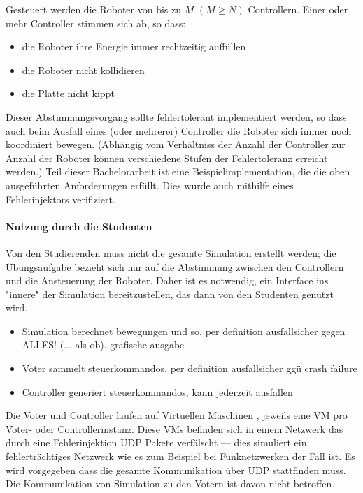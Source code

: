 \documentclass[
    12pt,
    bibliography=totoc,
    ngerman,
    enabledeprecatedfontcommands
]{scrartcl}
\begin{document}
Gesteuert werden die Roboter von bis zu $M$ $(M \geq N)$ Controllern. Einer oder mehr Controller stimmen sich ab,
so dass:
\begin{itemize}
\item die Roboter ihre Energie immer rechtzeitig auff{\"{u}}llen
\item die Roboter nicht kollidieren
\item die Platte nicht kippt
\end{itemize}

Dieser Abstimmungsvorgang sollte fehlertolerant implementiert werden, so dass auch beim Ausfall eines (oder mehrerer) Controller die Roboter sich immer noch koordiniert bewegen. (Abh{\"{a}}ngig vom Verh{\"{a}}ltniss der Anzahl der Controller zur
Anzahl der Roboter k{\"{o}}nnen verschiedene Stufen der Fehlertoleranz erreicht werden.\cite[s.149]{Werner00})
Teil dieser Bachelorarbeit ist eine
Beispielimplementation, die die oben ausgef{\"{u}}hrten Anforderungen erf{\"{u}}llt. Dies wurde auch mithilfe eines Fehlerinjektors verifiziert.

\paragraph{Nutzung durch die Studenten} Von den Studierenden muss nicht die gesamte Simulation erstellt werden; die {\"{U}}bungsaufgabe bezieht sich nur auf die Abstimmung zwischen den Controllern und die Ansteuerung der Roboter.
Daher ist es notwendig, ein Interface ins "innere" der Simulation bereitzustellen, das dann von den Studenten genutzt wird.

\begin{itemize}
\item Simulation berechnet bewegungen und so. per definition ausfallsicher gegen ALLES! (... als ob). grafische ausgabe
\item Voter sammelt steuerkommandos. per definition ausfallsicher ggü crash failure
\item Controller generiert steuerkommandos, kann jederzeit ausfallen
\end{itemize}

Die Voter und Controller laufen auf Virtuellen Maschinen , jeweils eine VM pro Voter- oder Controllerinstanz. Diese VMs befinden sich in einem Netzwerk das durch eine Fehlerinjektion UDP Pakete verf{\"{a}}lscht --- dies simuliert ein fehlertr{\"{a}}chtiges Netzwerk wie es zum Beispiel bei Funknetzwerken der Fall ist. Es wird vorgegeben dass die gesamte Kommunikation {\"{u}}ber UDP stattfinden muss.
Die Kommunikation von Simulation zu den Votern ist davon nicht betroffen.
\end{document}
